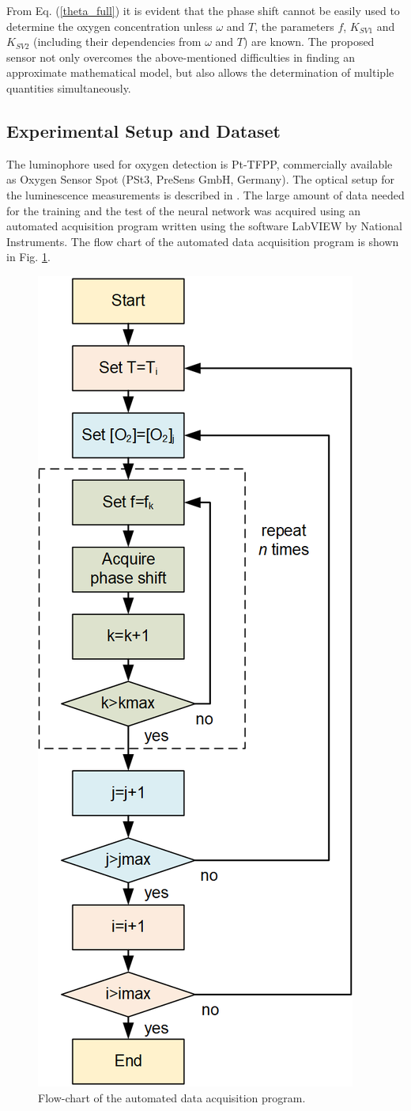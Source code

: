 \documentclass[sensors,article,submit,moreauthors,pdftex,10pt,a4paper]{Definitions/mdpi}
\begin{document}
From Eq. (\ref{theta_full}) it is evident that the phase shift cannot be easily used to determine the oxygen concentration unless $\omega$ and $T$, the parameters $f$, $K_{SV1}$ and $K_{SV2}$ (including their dependencies from $\omega$ and $T$) are known.
The proposed sensor not only overcomes the above-mentioned difficulties in finding an approximate mathematical model, but also allows the determination of multiple quantities simultaneously.

\subsection{Experimental Setup and Dataset}
\label{Experimental}

The luminophore used for oxygen detection is Pt-TFPP, commercially available as Oxygen Sensor Spot (PSt3, PreSens  GmbH, Germany). The optical setup for the luminescence measurements is described in \cite{Venturini_2020}. 
The large amount of data needed for the training and the test of the neural network was acquired using an automated acquisition program written using the software LabVIEW by National Instruments. The flow chart of the automated data acquisition program is shown in Fig. \ref{fig:auto-data}.

\begin{figure}[t!]
\centering
\includegraphics[keepaspectratio, width=5.8 cm]{flow-chart.png}
\caption{Flow-chart of the automated data acquisition program.}
\label{fig:auto-data}
\end{figure}
\end{document}
